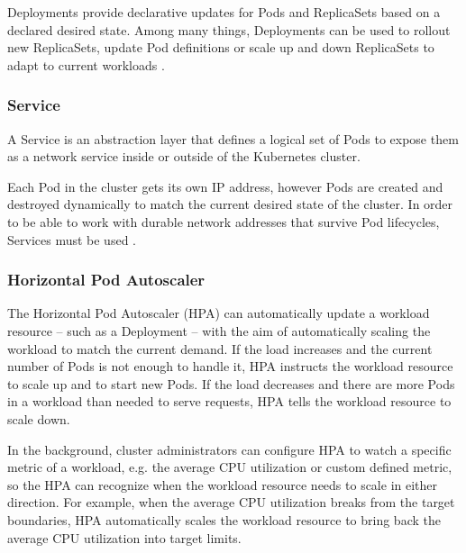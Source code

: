 Deployments provide declarative updates for Pods and ReplicaSets based on a declared desired state. Among many things, Deployments can be used to rollout new ReplicaSets, update Pod definitions or scale up and down ReplicaSets to adapt to current workloads \cite{KubernetesDeployment}.

\subsubsection{Service} \label{k8s-service}

A Service is an abstraction layer that defines a logical set of Pods to expose them as a network service inside or outside of the Kubernetes cluster.

Each Pod in the cluster gets its own IP address, however Pods are created and destroyed dynamically to match the current desired state of the cluster. In order to be able to work with durable network addresses that survive Pod lifecycles, Services must be used \cite{KubernetesService}.


\subsubsection{Horizontal Pod Autoscaler}

The Horizontal Pod Autoscaler (HPA) can automatically update a workload resource -- such as a Deployment -- with the aim of automatically scaling the workload to match the current demand. If the load increases and the current number of Pods is not enough to handle it, HPA instructs the workload resource to scale up and to start new Pods. If the load decreases and there are more Pods in a workload than needed to serve requests, HPA tells the workload resource to scale down.

In the background, cluster administrators can configure HPA to watch a specific metric of a workload, e.g. the average CPU utilization or custom defined metric, so the HPA can recognize when the workload resource needs to scale in either direction. For example, when the average CPU utilization breaks from the target boundaries, HPA automatically scales the workload resource to bring back the average CPU utilization into target limits.

